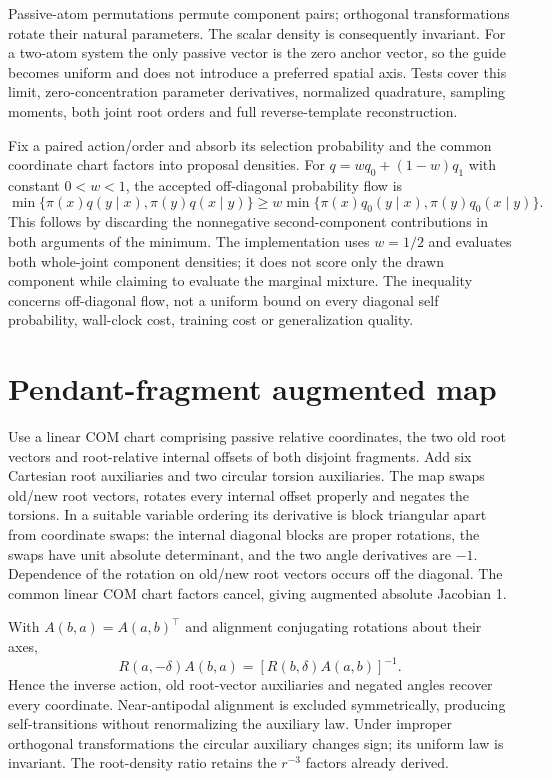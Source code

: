 Passive-atom permutations permute component pairs; orthogonal transformations
rotate their natural parameters. The scalar density is consequently invariant.
For a two-atom system the only passive vector is the zero anchor vector, so the
guide becomes uniform and does not introduce a preferred spatial axis. Tests
cover this limit, zero-concentration parameter derivatives, normalized quadrature,
sampling moments, both joint root orders and full reverse-template reconstruction.

Fix a paired action/order and absorb its selection probability and the common
coordinate chart factors into proposal densities. For $q=wq_0+(1-w)q_1$ with
constant $0<w<1$, the accepted off-diagonal probability flow is
\[
 \min\{\pi(x)q(y\mid x),\pi(y)q(x\mid y)\}
 \ge w\min\{\pi(x)q_0(y\mid x),\pi(y)q_0(x\mid y)\}.
\]
This follows by discarding the nonnegative second-component contributions in
both arguments of the minimum. The implementation uses $w=1/2$ and evaluates
both whole-joint component densities; it does not score only the drawn component
while claiming to evaluate the marginal mixture. The inequality concerns
off-diagonal flow, not a uniform bound on every diagonal self probability,
wall-clock cost, training cost or generalization quality.

\section{Pendant-fragment augmented map}
Use a linear COM chart comprising passive relative coordinates, the two old root
vectors and root-relative internal offsets of both disjoint fragments. Add six
Cartesian root auxiliaries and two circular torsion auxiliaries. The map swaps
old/new root vectors, rotates every internal offset properly and negates the
torsions. In a suitable variable ordering its derivative is block triangular
apart from coordinate swaps: the internal diagonal blocks are proper rotations,
the swaps have unit absolute determinant, and the two angle derivatives are $-1$.
Dependence of the rotation on old/new root vectors occurs off the diagonal.
The common linear COM chart factors cancel, giving augmented absolute Jacobian 1.

With $A(b,a)=A(a,b)^\top$ and alignment conjugating rotations about their axes,
\[
 R(a,-\delta)A(b,a)=[R(b,\delta)A(a,b)]^{-1}.
\]
Hence the inverse action, old root-vector auxiliaries and negated angles recover
every coordinate. Near-antipodal alignment is excluded symmetrically, producing
self-transitions without renormalizing the auxiliary law. Under improper
orthogonal transformations the circular auxiliary changes sign; its uniform law
is invariant. The root-density ratio retains the $r^{-3}$ factors already derived.

